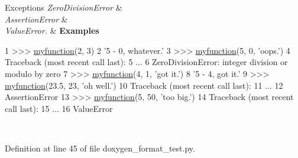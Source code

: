 \begin{DoxyExceptions}{Exceptions}
{\em Zero\-Division\-Error} & \\
\hline
{\em Assertion\-Error} & \\
\hline
{\em Value\-Error.} & {\bfseries Examples} 
\begin{DoxyCode}
1 >>> \hyperlink{namespacedoxygen__format__test_a353de492e2aea248f9e0ae14a43520db}{myfunction}(2, 3)
2 \textcolor{stringliteral}{'5 - 0, whatever.'}
3 >>> \hyperlink{namespacedoxygen__format__test_a353de492e2aea248f9e0ae14a43520db}{myfunction}(5, 0, \textcolor{stringliteral}{'oops.'})
4 Traceback (most recent call last):
5     ...
6 ZeroDivisionError: integer division \textcolor{keywordflow}{or} modulo by zero
7 >>> \hyperlink{namespacedoxygen__format__test_a353de492e2aea248f9e0ae14a43520db}{myfunction}(4, 1, \textcolor{stringliteral}{'got it.'})
8 \textcolor{stringliteral}{'5 - 4, got it.'}
9 >>> \hyperlink{namespacedoxygen__format__test_a353de492e2aea248f9e0ae14a43520db}{myfunction}(23.5, 23, \textcolor{stringliteral}{'oh well.'})
10 Traceback (most recent call last):
11     ...
12 AssertionError
13 >>> \hyperlink{namespacedoxygen__format__test_a353de492e2aea248f9e0ae14a43520db}{myfunction}(5, 50, \textcolor{stringliteral}{'too big.'})
14 Traceback (most recent call last):
15     ...
16 ValueError
\end{DoxyCode}
 \\
\hline
\end{DoxyExceptions}


Definition at line 45 of file doxygen\-\_\-format\-\_\-test.\-py.

